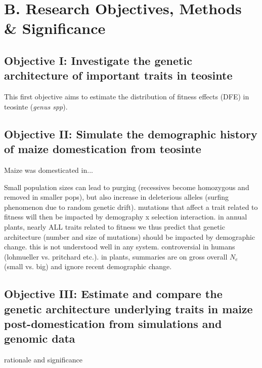 	




\section*{B. Research Objectives, Methods \& Significance}
\subsection*{Objective I: Investigate the genetic architecture of important traits in teosinte}

This first objective aims to estimate the distribution of fitness effects (DFE) in teosinte (\emph{genus spp}).


\subsection*{Objective II: Simulate the demographic history of maize domestication from teosinte}
Maize was domesticated in...




Small population sizes can lead to purging (recessives become homozygous and removed in smaller pops), but also increase in deleterious alleles (surfing phenomenon due to random genetic drift).
mutations that affect a trait related to fitness will then be impacted by demography x selection interaction.
in annual plants, nearly ALL traits related to fitness
we thus predict that genetic architecture (number and size of mutations) should be impacted by demographic change.
this is not understood well in any system. controversial in humans (lohmueller vs. pritchard etc.). in plants, summaries are on gross overall $N_e$ (small vs. big) and ignore recent demographic change.





\subsection*{Objective III: Estimate and compare the genetic architecture underlying traits in maize post-domestication from simulations and genomic data} 
 rationale and significance












